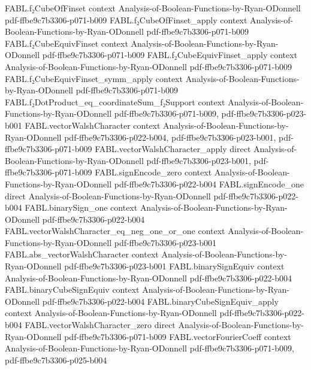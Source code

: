 \begin{theorem}
  {FABL.f₂CubeOfFinset}
  {context}
  {Analysis-of-Boolean-Functions-by-Ryan-ODonnell}
  {pdf-ffbe9c7b3306-p071-b009}
\proofstep
  {FABL.f₂CubeOfFinset_apply}
  {context}
  {Analysis-of-Boolean-Functions-by-Ryan-ODonnell}
  {pdf-ffbe9c7b3306-p071-b009}
\proofstep
  {FABL.f₂CubeEquivFinset}
  {context}
  {Analysis-of-Boolean-Functions-by-Ryan-ODonnell}
  {pdf-ffbe9c7b3306-p071-b009}
\proofstep
  {FABL.f₂CubeEquivFinset_apply}
  {context}
  {Analysis-of-Boolean-Functions-by-Ryan-ODonnell}
  {pdf-ffbe9c7b3306-p071-b009}
\proofstep
  {FABL.f₂CubeEquivFinset_symm_apply}
  {context}
  {Analysis-of-Boolean-Functions-by-Ryan-ODonnell}
  {pdf-ffbe9c7b3306-p071-b009}
\proofstep
  {FABL.f₂DotProduct_eq_coordinateSum_f₂Support}
  {context}
  {Analysis-of-Boolean-Functions-by-Ryan-ODonnell}
  {pdf-ffbe9c7b3306-p071-b009,
    pdf-ffbe9c7b3306-p023-b001}
\proofstep
  {FABL.vectorWalshCharacter}
  {context}
  {Analysis-of-Boolean-Functions-by-Ryan-ODonnell}
  {pdf-ffbe9c7b3306-p022-b004,
    pdf-ffbe9c7b3306-p023-b001,
    pdf-ffbe9c7b3306-p071-b009}
\proofstep
  {FABL.vectorWalshCharacter_apply}
  {direct}
  {Analysis-of-Boolean-Functions-by-Ryan-ODonnell}
  {pdf-ffbe9c7b3306-p023-b001,
    pdf-ffbe9c7b3306-p071-b009}
\proofstep
  {FABL.signEncode_zero}
  {context}
  {Analysis-of-Boolean-Functions-by-Ryan-ODonnell}
  {pdf-ffbe9c7b3306-p022-b004}
\proofstep
  {FABL.signEncode_one}
  {direct}
  {Analysis-of-Boolean-Functions-by-Ryan-ODonnell}
  {pdf-ffbe9c7b3306-p022-b004}
\proofstep
  {FABL.binarySign_one}
  {context}
  {Analysis-of-Boolean-Functions-by-Ryan-ODonnell}
  {pdf-ffbe9c7b3306-p022-b004}
\proofstep
  {FABL.vectorWalshCharacter_eq_neg_one_or_one}
  {context}
  {Analysis-of-Boolean-Functions-by-Ryan-ODonnell}
  {pdf-ffbe9c7b3306-p023-b001}
\proofstep
  {FABL.abs_vectorWalshCharacter}
  {context}
  {Analysis-of-Boolean-Functions-by-Ryan-ODonnell}
  {pdf-ffbe9c7b3306-p023-b001}
\proofstep
  {FABL.binarySignEquiv}
  {context}
  {Analysis-of-Boolean-Functions-by-Ryan-ODonnell}
  {pdf-ffbe9c7b3306-p022-b004}
\proofstep
  {FABL.binaryCubeSignEquiv}
  {context}
  {Analysis-of-Boolean-Functions-by-Ryan-ODonnell}
  {pdf-ffbe9c7b3306-p022-b004}
\proofstep
  {FABL.binaryCubeSignEquiv_apply}
  {context}
  {Analysis-of-Boolean-Functions-by-Ryan-ODonnell}
  {pdf-ffbe9c7b3306-p022-b004}
\proofstep
  {FABL.vectorWalshCharacter_zero}
  {direct}
  {Analysis-of-Boolean-Functions-by-Ryan-ODonnell}
  {pdf-ffbe9c7b3306-p071-b009}
\proofstep
  {FABL.vectorFourierCoeff}
  {context}
  {Analysis-of-Boolean-Functions-by-Ryan-ODonnell}
  {pdf-ffbe9c7b3306-p071-b009,
    pdf-ffbe9c7b3306-p025-b004}

\end{theorem}
